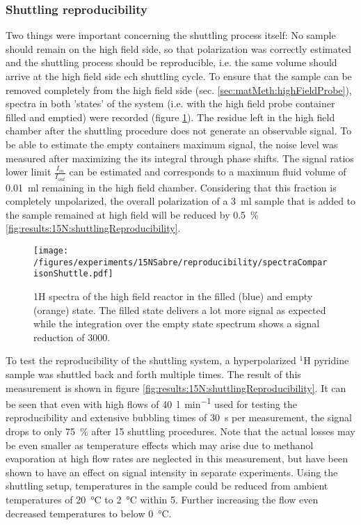         \subsubsection{Shuttling reproducibility}
            \label{results:15N:shuttlingReproducibility}
            Two things were important concerning the shuttling process itself: No sample should remain on the high field side, so that polarization was correctly estimated and the shuttling process should be reproducible, i.e. the same volume should arrive at the high field side ech shuttling cycle.
            To ensure that the sample can be removed completely from the high field side (sec. \ref{sec:matMeth:highFieldProbe}), spectra in both 'states' of the system (i.e. with the high field probe container filled and emptied) were recorded (figure \ref{fig:results:15N:shuttlingRemoval}). The residue left in the high field chamber after the shuttling procedure does not generate an observable signal. To be able to estimate the empty containers maximum signal, the noise level was measured after maximizing the its integral through phase shifts. The signal ratios lower limit $\frac{I_{in}}{I_{out}}$ can be estimated and corresponds to a maximum fluid volume of \SI{0.01}{ml} remaining in the high field chamber. Considering that this fraction is completely unpolarized, the overall polarization of a \SI{3}{ml} sample that is added to the sample remained at high field  will be reduced by \SI{0.5}{\percent} \ref{fig:results:15N:shuttlingReproducibility}.
            \begin{figure}
                \centering
                \texttt{[image: /figures/experiments/15NSabre/reproducibility/spectraComparisonShuttle.pdf]}
                \caption[High field removal efficiency]{1H spectra of the high field reactor in the filled (blue) and empty (orange) state. The filled state delivers a lot more signal as expected while the integration over the empty state spectrum shows a signal reduction of 3000.}
                \label{fig:results:15N:shuttlingRemoval}
            \end{figure}
            To test the reproducibility of the shuttling system, a hyperpolarized $^{1}$H pyridine sample was shuttled back and forth multiple times. The result of this measurement is shown in figure \ref{fig:results:15N:shuttlingReproducibility}. It can be seen that even with high flows of \SI{40}{\litre\per\minute} used for testing the reproducibility and extensive bubbling times of \SI{30}{\second} per measurement, the signal drops to only \SI{75}{\percent} after 15 shuttling procedures. Note that the actual losses may be even smaller as temperature effects which may arise due to methanol evaporation at high flow rates are neglected in this measurement, but have been shown to have an effect on signal intensity in separate experiments. Using the shuttling setup, temperatures in the sample could be reduced from ambient temperatures of \SI{20}{\celsius} to \SI{2}{\celsius} within \SI{5}{\min}. Further increasing the flow even decreased temperatures to below \SI{0}{\celsius}.

